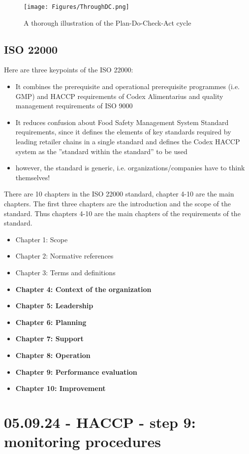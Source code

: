 \begin{figure}
    \centering
    \texttt{[image: Figures/ThroughDC.png]}
    \caption{A thorough illustration of the Plan-Do-Check-Act cycle}
    \label{fig:ThoroughDC}
\end{figure}



\subsection{ISO 22000}
Here are three keypoints of the ISO 22000:

\begin{highlight}
    \begin{itemize}
        \item It combines the prerequisite and operational prerequisite
        programmes (i.e. GMP) and HACCP requirements of Codex
        Alimentarius and quality management requirements of ISO 9000
        \item It reduces confusion about Food Safety Management System
        Standard requirements, since it defines the elements of key
        standards required by leading retailer chains in a single standard
        and defines the Codex HACCP system as the ”standard within the
        standard” to be used
        \item however, the standard is generic, i.e. organizations/companies have to think themselves!
    \end{itemize}
\end{highlight}

There are 10 chapters in the ISO 22000 standard, chapter 4-10 are the main chapters. The first three chapters are the introduction and the scope of the standard. Thus chapters 4-10 are the main chapters of the requirements of the standard.

\begin{highlight}
    \begin{itemize}
        \item Chapter 1: Scope
        \item Chapter 2: Normative references
        \item Chapter 3: Terms and definitions
        \item \textbf{Chapter 4: Context of the organization}
        \item \textbf{Chapter 5: Leadership}
        \item \textbf{Chapter 6: Planning}
        \item \textbf{Chapter 7: Support}
        \item \textbf{Chapter 8: Operation}
        \item \textbf{Chapter 9: Performance evaluation}
        \item \textbf{Chapter 10: Improvement}
    \end{itemize}
\end{highlight}





\section{05.09.24 - HACCP - step 9: monitoring procedures}